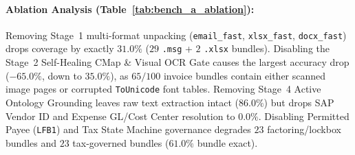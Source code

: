 \documentclass[10pt,twocolumn,letterpaper]{article}
\begin{document}
\paragraph{Ablation Analysis (Table~\ref{tab:bench_a_ablation}):}
Removing Stage~1 multi-format unpacking (\texttt{email\_fast}, \texttt{xlsx\_fast}, \texttt{docx\_fast}) drops coverage by exactly $31.0\%$ ($29$ \texttt{.msg} + $2$ \texttt{.xlsx} bundles). Disabling the Stage~2 Self-Healing CMap \& Visual OCR Gate causes the largest accuracy drop ($-65.0\%$, down to $35.0\%$), as $65/100$ invoice bundles contain either scanned image pages or corrupted \texttt{ToUnicode} font tables. Removing Stage~4 Active Ontology Grounding leaves raw text extraction intact ($86.0\%$) but drops SAP Vendor ID and Expense GL/Cost Center resolution to $0.0\%$. Disabling Permitted Payee (\texttt{LFB1}) and Tax State Machine governance degrades $23$ factoring/lockbox bundles and $23$ tax-governed bundles ($61.0\%$ bundle exact).

\begin{table}[t]
\centering
\caption{Benchmark B (\emph{Assurant Documentoscopia} Brazilian Insurance Claims, $8$ Claims, $88$ Files: $44$ Primary Documents + $44$ Empty \texttt{.retries}): Ablation and baseline comparison across key claim verification tasks.}
\label{tab:bench_b_ablation}
\vspace{-0.4em}
\end{table}
\end{document}

